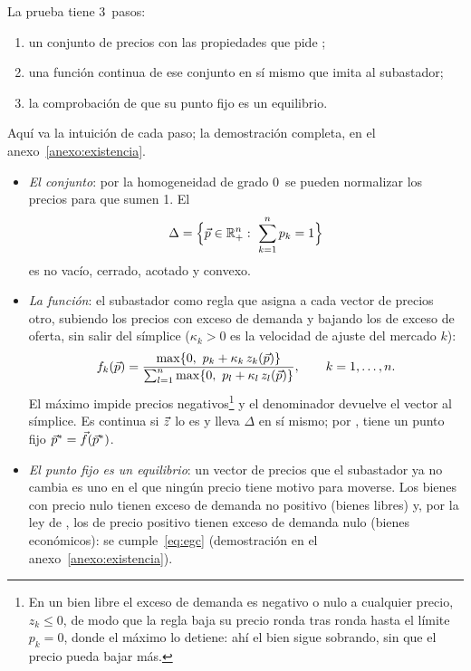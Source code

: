 \documentclass[11pt]{article}
\begin{document}
La prueba tiene 3~pasos:
\begin{enumerate}
\item un conjunto de precios con las propiedades que pide ;
\item una función continua de ese conjunto en sí mismo que imita al subastador;
\item la comprobación de que su punto fijo es un equilibrio.
\end{enumerate}
Aquí va la intuición de cada paso; la demostración completa, en el anexo~\ref{anexo:existencia}.

\begin{itemize}
\item \emph{El conjunto}: por la homogeneidad de grado 0~se pueden normalizar los precios para que sumen 1. El 
  \begin{equation}
  \Delta=\Big\{\vect{p}\in\mathbb{R}^n_+:\ \sum_{k=1}^{n}p_k=1\Big\} \label{eq:simplice}
  \end{equation}
  es no vacío, cerrado, acotado y convexo.
\item \emph{La función}: el subastador como regla que asigna a cada vector de precios otro, subiendo los precios con exceso de demanda y bajando los de exceso de oferta, sin salir del símplice ($\kappa_k>0$ es la velocidad de ajuste del mercado $k$):
  \begin{equation}
  f_k(\vect{p})=\frac{\max\{0,\ p_k+\kappa_k\,z_k(\vect{p})\}}{\sum_{l=1}^{n}\max\{0,\ p_l+\kappa_l\,z_l(\vect{p})\}},\qquad k=1,\dots,n. \label{eq:aplicacion-brouwer}
  \end{equation}
  El máximo impide precios negativos\footnote{En un bien libre el exceso de demanda es negativo o nulo a cualquier precio, $z_k\leq 0$, de modo que la regla baja su precio ronda tras ronda hasta el límite $p_k=0$, donde el máximo lo detiene: ahí el bien sigue sobrando, sin que el precio pueda bajar más.} y el denominador devuelve el vector al símplice. Es continua si $\vec{z}$ lo es y lleva $\Delta$ en sí mismo; por , tiene un punto fijo $\vec{p}^*=\vec{f}(\vec{p}^*)$.
\item \emph{El punto fijo es un equilibrio}: un vector de precios que el subastador ya no cambia es uno en el que ningún precio tiene motivo para moverse. Los bienes con precio nulo tienen exceso de demanda no positivo (bienes libres) y, por la ley de , los de precio positivo tienen exceso de demanda nulo (bienes económicos): se cumple~\eqref{eq:egc} (demostración en el anexo~\ref{anexo:existencia}).
\end{itemize}
\end{document}
